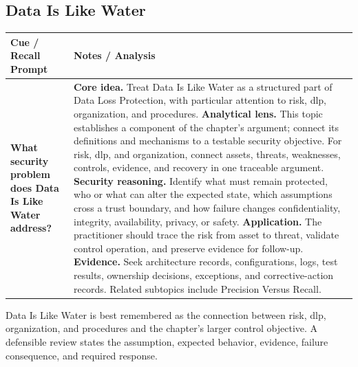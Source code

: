 \documentclass[11pt]{article}
\newcommand{\CornellHeader}{%
\rowcolor{Navy}\color{white}\bfseries Cue / Recall Prompt & \color{white}\bfseries Notes / Analysis\\\hline}
\newcommand{\CornellRow}[2]{%
\cellcolor{CueGray}\RaggedRight\textbf{#1} & \RaggedRight #2\\\hline}
\begin{document}
\subsection*{Data Is Like Water}
\begin{longtable}{>{\RaggedRight\arraybackslash}p{}|>{\RaggedRight\arraybackslash}p{}}
\CornellHeader
\CornellRow{What security problem does Data Is Like Water address?}{\textbf{Core idea.} Treat Data Is Like Water as a structured part of Data Loss Protection, with particular attention to risk, dlp, organization, and procedures. \textbf{Analytical lens.} This topic establishes a component of the chapter's argument; connect its definitions and mechanisms to a testable security objective. For risk, dlp, and organization, connect assets, threats, weaknesses, controls, evidence, and recovery in one traceable argument. \textbf{Security reasoning.} Identify what must remain protected, who or what can alter the expected state, which assumptions cross a trust boundary, and how failure changes confidentiality, integrity, availability, privacy, or safety. \textbf{Application.} The practitioner should trace the risk from asset to threat, validate control operation, and preserve evidence for follow-up. \textbf{Evidence.} Seek architecture records, configurations, logs, test results, ownership decisions, exceptions, and corrective-action records. Related subtopics include Precision Versus Recall.}
\end{longtable}
\begin{topicsummary}
Data Is Like Water is best remembered as the connection between risk, dlp, organization, and procedures and the chapter's larger control objective. A defensible review states the assumption, expected behavior, evidence, failure consequence, and required response.
\end{topicsummary}
\end{document}
